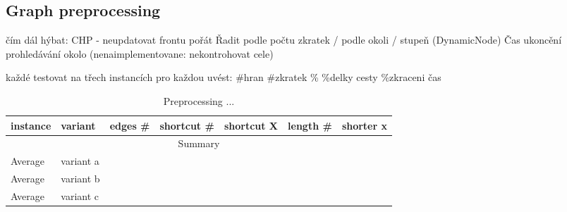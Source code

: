\subsection{Graph preprocessing}
čím dál hýbat:
CHP - neupdatovat frontu pořát 
Řadit podle počtu zkratek / podle okoli / stupeň (DynamicNode)
Čas ukoncění prohledávání okolo
(nenaimplementovane: nekontrohovat cele)

každé testovat na třech instancích
pro každou uvést: 
\#hran \#zkratek \% \%delky cesty \%zkraceni čas


\begin{table}
\caption{Preprocessing ...}
\label{table1}
\begin{tabular}{l|l|ccc|cc}
instance & variant & edges \# & shortcut \# & shortcut X & length \# & shorter x \\ \hline
\multicolumn{7}{c}{Summary} \\ \hline
Average & variant a & & & & & \\ \hline
Average & variant b & & & & & \\ \hline
Average & variant c & & & & & \\ \hline
\end{tabular}
\end{table}

